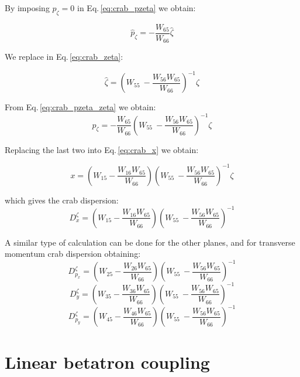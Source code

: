 By imposing $p_\zeta = 0$ in Eq.\,\ref{eq:crab_pzeta} we obtain:

\begin{equation}
\hat{p}_\zeta = - \frac{W_{65}}{W_{66}}\hat{\zeta}
\label{eq:crab_pzeta_zeta}
\end{equation}

We replace in Eq.\,\ref{eq:crab_zeta}:

\begin{equation}
\hat{\zeta} = \left( W_{55}\ -  \frac{W_{56}W_{65}}{W_{66}} \right)^{-1}\zeta
\end{equation}

From Eq.\,\ref{eq:crab_pzeta_zeta} we obtain:
\begin{equation}
\hat{p}_\zeta = - \frac{W_{65}}{W_{66}}\left( W_{55}\ -  \frac{W_{56}W_{65}}{W_{66}} \right)^{-1} \zeta
\end{equation}

Replacing the last two into Eq.\,\ref{eq:crab_x} we obtain:

\begin{equation}
x = \left(W_{15} -\frac{W_{16}W_{65}}{W_{66}}\right)\left( W_{55}\ -  \frac{W_{56}W_{65}}{W_{66}} \right)^{-1} \zeta
\end{equation}

which gives the crab dispersion:
\begin{equation}
D_x^\zeta = \left(W_{15} -\frac{W_{16}W_{65}}{W_{66}}\right)\left( W_{55}\ -  \frac{W_{56}W_{65}}{W_{66}} \right)^{-1}
\end{equation}

A similar type of calculation can be done for the other planes, and for transverse momentum crab dispersion obtaining:
\begin{equation}
D_{p_x}^\zeta = \left(W_{25} -\frac{W_{26}W_{65}}{W_{66}}\right)\left( W_{55}\ -  \frac{W_{56}W_{65}}{W_{66}} \right)^{-1}
\end{equation}
\begin{equation}
D_{y}^\zeta = \left(W_{35} -\frac{W_{36}W_{65}}{W_{66}}\right)\left( W_{55}\ -  \frac{W_{56}W_{65}}{W_{66}} \right)^{-1}
\end{equation}
\begin{equation}
D_{p_y}^\zeta = \left(W_{45} -\frac{W_{46}W_{65}}{W_{66}}\right)\left( W_{55}\ -  \frac{W_{56}W_{65}}{W_{66}} \right)^{-1}
\end{equation}

\section{Linear betatron coupling}

